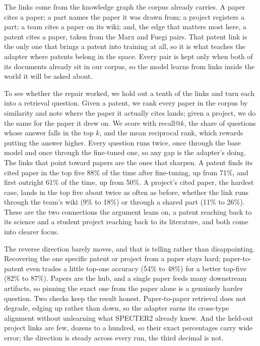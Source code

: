 \documentclass[12pt,a4paper]{article}
\begin{document}
	The links come from the knowledge graph the corpus already carries. A paper cites a paper; a part names the paper it was drawn from; a project registers a part; a team cites a paper on its wiki; and, the edge that matters most here, a patent cites a paper, taken from the Marx and Fuegi pairs. That patent link is the only one that brings a patent into training at all, so it is what teaches the adapter where patents belong in the space. Every pair is kept only when both of its documents already sit in our corpus, so the model learns from links inside the world it will be asked about.

	To see whether the repair worked, we hold out a tenth of the links and turn each into a retrieval question. Given a patent, we rank every paper in the corpus by similarity and note where the paper it actually cites lands; given a project, we do the same for the paper it drew on. We score with recall@$k$, the share of questions whose answer falls in the top $k$, and the mean reciprocal rank, which rewards putting the answer higher. Every question runs twice, once through the base model and once through the fine-tuned one, so any gap is the adapter's doing. The links that point toward papers are the ones that sharpen. A patent finds its cited paper in the top five 88\% of the time after fine-tuning, up from 71\%, and first outright 61\% of the time, up from 50\%. A project's cited paper, the hardest case, lands in the top five about twice as often as before, whether the link runs through the team's wiki (9\% to 18\%) or through a shared part (11\% to 26\%). These are the two connections the argument leans on, a patent reaching back to its science and a student project reaching back to its literature, and both come into clearer focus.

	The reverse direction barely moves, and that is telling rather than disappointing. Recovering the one specific patent or project from a paper stays hard; paper-to-patent even trades a little top-one accuracy (54\% to 48\%) for a better top-five (82\% to 87\%). Papers are the hub, and a single paper feeds many downstream artifacts, so pinning the exact one from the paper alone is a genuinely harder question. Two checks keep the result honest. Paper-to-paper retrieval does not degrade, edging up rather than down, so the adapter earns its cross-type alignment without unlearning what SPECTER2 already knew. And the held-out project links are few, dozens to a hundred, so their exact percentages carry wide error; the direction is steady across every run, the third decimal is not.
	
\end{document}
